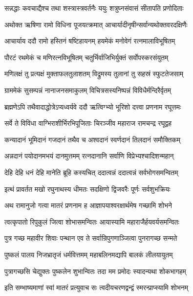 \twolineshloka
{सन्नद्धाः कवचाद्यैश्च तथा शस्त्रास्त्रवर्तनैः}
{ययुः शत्रुघ्नसंवासं सीतापति प्रणोदिताः}%


\twolineshloka
{अथोक्त ऋषिणा रामो विधिना पूजयत्क्रमात्}
{आचार्यादीनृषीन्सर्वान्यथोक्तवरदक्षिणैः}%

\twolineshloka
{आचार्याय ददौ रामो हस्तिनं षष्टिहायनम्}
{हयमेकं मनोवेगं रत्नमालाविभूषितम्}%

\twolineshloka
{पौरटं रथमेकं च मणिरत्नविभूषितम्}
{चतुर्भिर्वाजिभिर्युक्तं सर्वोपस्करसंयुतम्}%

\twolineshloka
{मणिलक्षं तु प्रत्यक्षं मुक्ताफलतुलाशतम्}
{विद्रुमस्य तुलानां तु सहस्रं स्फुटतेजसाम्}%

\twolineshloka
{ग्राममेकं सुसम्पन्नं नानाजनसमाकुलम्}
{विचित्रसस्यनिष्पन्नं विविधैर्मन्दिरैर्वृतम्}%

\twolineshloka
{ब्रह्मणेऽपि तथैवादाद्धोत्रेऽप्यध्वर्यवे ददौ}
{ऋत्विग्भ्यो भूरिशो दत्त्वा प्रणनाम रघूत्तमः}%

\twolineshloka
{सर्वे ते विविधा वाग्भिराशीर्भिरभिपूजिताः}
{चिरञ्जीव महाराज रामचन्द्र रघूद्वह}%

\twolineshloka
{कन्यादानं भूमिदानं गजदानं तथैव च}
{अश्वदानं स्वर्णदानं तिलदानं समौक्तिकम्}%

\twolineshloka
{अन्नदानं पयोदानमभयं दानमुत्तमम्}
{रत्नदानानि सर्वाणि विप्रेभ्यश्चादिशन्महान्}%

\twolineshloka
{देहि देहि धनं देहि मानेति ब्रूहि कस्यचित्}
{ददात्वन्नं ददात्वन्नं सर्वभोगसमन्वितम्}%

\twolineshloka
{इत्थं प्रावर्तत मखो रघुनाथस्य धीमतः}
{सदक्षिणो द्विजवरैः पूर्णः सर्वशुभक्रियः}%

\twolineshloka
{अथ रामानुजो गत्वा मातरं प्रणनाम ह}
{आज्ञापयाश्वरक्षार्थमेष गच्छामि शोभने}%

\twolineshloka
{त्वत्कृपातो रिपुकुलं जित्वा शोभासमन्वितः}
{आयास्यामि महाराजैर्हयवर्यसमन्वितः}%


\twolineshloka
{पुत्र गच्छ महावीर शिवाः पन्थान एव ते}
{सर्वान्रिपुगणाञ्जित्वा पुनरागच्छ सन्मते}%

\twolineshloka
{पुष्कलं पालय निजभ्रातृजं धर्मवित्तमम्}
{महाबलिनमद्यापि बालकं लीलयायुतम्}%

\twolineshloka
{पुत्रागच्छसि चेद्युक्तः पुष्कलेन शुभान्वितः}
{तदा मम प्रमोदः स्यादन्यथा शोकभागहम्}%

\twolineshloka
{इति सम्भाष्यमाणां स्वां मातरं प्रत्युवाच सः}
{त्वदीयचरणद्वन्द्वं स्मरन्प्राप्स्यामि शोभनम्}%

